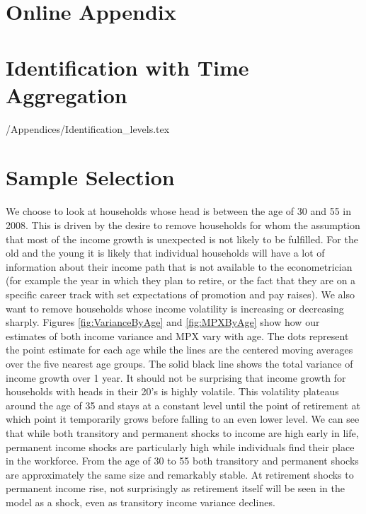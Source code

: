 \documentclass[titlepage]{\econtex}\newcommand{\texname}{ConsumptionHeterogeneity}
\begin{document}
\small

\normalsize

\pagebreak
\appendix
\renewcommand\thefigure{\thesection.\arabic{figure}}  
\renewcommand\thetable{\thesection.\arabic{table}}  

\section*{Online Appendix}

\section{Identification with Time Aggregation}\label{sec:Identification}

\setcounter{figure}{0}   
\setcounter{table}{0} 
\econtexRoot/Appendices/Identification_levels.tex

\section{Sample Selection} \label{sample_selection}
\setcounter{figure}{0}   
\setcounter{table}{0} 
We choose to look at households whose head is between the age of 30 and 55 in 2008. This is driven by the desire to remove households for whom the assumption that most of the income growth is unexpected is not likely to be fulfilled. For the old and the young it is likely that individual households will have a lot of information about their income path that is not available to the econometrician (for example the year in which they plan to retire, or the fact that they are on a specific career track with set expectations of promotion and pay raises). We also want to remove households whose income volatility is increasing or decreasing sharply. Figures \ref{fig:VarianceByAge} and \ref{fig:MPXByAge} show how our estimates of both income variance and MPX vary with age. The dots represent the point estimate for each age while the lines are the centered moving averages over the five nearest age groups. The solid black line shows the total variance of income growth over 1 year. It should not be surprising that income growth for households with heads in their 20's is highly volatile. This volatility plateaus around the age of 35 and stays at a constant level until the point of retirement at which point it temporarily grows before falling to an even lower level. We can see that while both transitory and permanent shocks to income are high early in life, permanent income shocks are particularly high while individuals find their place in the workforce. From the age of 30 to 55 both transitory and permanent shocks are approximately the same size and remarkably stable. At retirement shocks to permanent income rise, not surprisingly as retirement itself will be seen in the model as a shock, even as transitory income variance declines.
\end{document}
